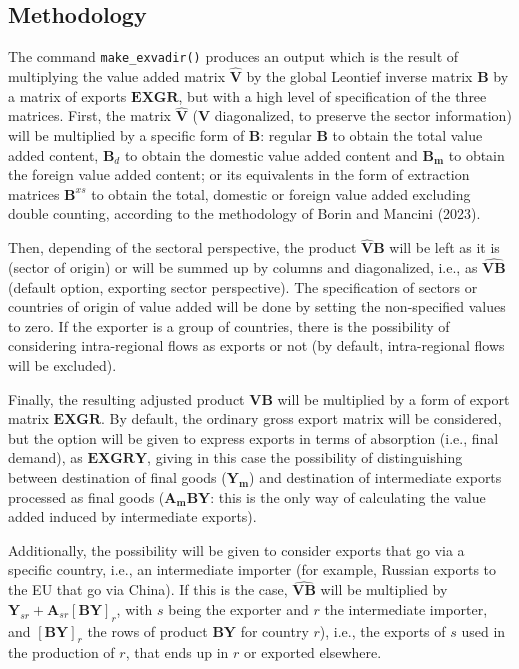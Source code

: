 \hypertarget{methodology}{%
\subsection{Methodology}\label{methodology}}

The command \texttt{make\_exvadir()} produces an output which is the result of
multiplying the value added matrix \(\hat{\mathbf{V}}\) by the global Leontief
inverse matrix \(\mathbf{B}\) by a matrix of exports \(\mathbf{EXGR}\), but with a
high level of specification of the three matrices. First, the matrix
\(\hat{\mathbf{V}}\) (\(\mathbf{V}\) diagonalized, to preserve the sector
information) will be multiplied by a specific form of \(\mathbf{B}\): regular
\(\mathbf{B}\) to obtain the total value added content, \(\mathbf{B}_d\) to obtain
the domestic value added content and \(\mathbf{B_m}\) to obtain the foreign value
added content; or its equivalents in the form of extraction matrices
\(\mathbf{B}^{xs}\) to obtain the total, domestic or foreign value added excluding
double counting, according to the methodology of
Borin and Mancini (2023).

Then, depending of the sectoral perspective, the product \(\hat{\mathbf{V}} \mathbf{B}\) will be left as it is (sector of origin) or will be summed up by
columns and diagonalized, i.e., as \(\widehat{\mathbf{VB}}\) (default option,
exporting sector perspective). The specification of sectors or countries of
origin of value added will be done by setting the non-specified values to zero.
If the exporter is a group of countries, there is the possibility of considering
intra-regional flows as exports or not (by default, intra-regional flows will be
excluded).

Finally, the resulting adjusted product \({\mathbf{VB}}\) will be multiplied by a
form of export matrix \(\mathbf{EXGR}\). By default, the ordinary gross export
matrix will be considered, but the option will be given to express exports in
terms of absorption (i.e., final demand), as \(\mathbf{EXGRY}\), giving in this
case the possibility of distinguishing between destination of final goods
(\(\mathbf{Y_m}\)) and destination of intermediate exports processed as final
goods (\(\mathbf{A_m B Y}\): this is the only way of calculating the value added
induced by intermediate exports).

Additionally, the possibility will be given to consider exports that go via a
specific country, i.e., an intermediate importer (for example, Russian exports
to the EU that go via China). If this is the case, \(\widehat{\mathbf{VB}}\) will
be multiplied by \(\mathbf{Y}_{sr} + \mathbf{A}_{sr}[\mathbf{BY}]_r\), with \(s\)
being the exporter and \(r\) the intermediate importer, and \([\mathbf{BY}]_r\)
the rows of product \(\mathbf{BY}\) for country \(r\)), i.e., the exports of \(s\)
used in the production of \(r\), that ends up in \(r\) or exported elsewhere.

